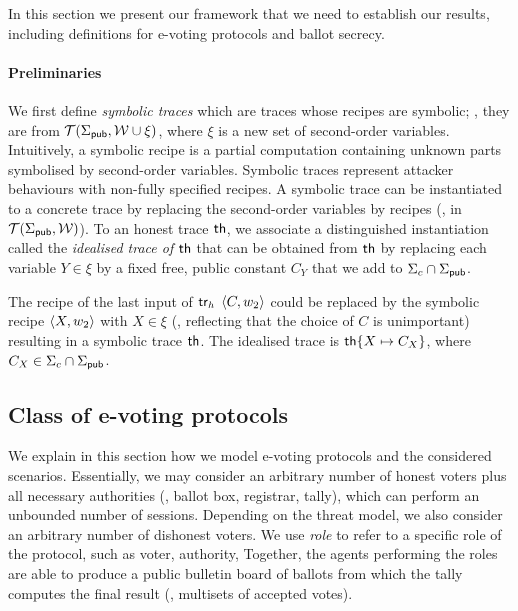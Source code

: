In this section we present our framework that we need to establish our
results, including definitions for
e-voting protocols and ballot secrecy.

\paragraph{\textbf{Preliminaries}}
We first define {\em symbolic traces} which are traces
whose recipes are symbolic; \ie, they are from $\mathcal{T}(\Sigma_{\mathsf{pub}},\mathcal{W}\cup\xi)$,
where $\xi$ is a new set of second-order variables.
Intuitively, a symbolic recipe is a partial computation
containing unknown parts symbolised by second-order variables.
Symbolic traces represent attacker behaviours with non-fully specified
recipes.
A symbolic trace can be instantiated to a concrete trace by replacing
the second-order variables by recipes (\ie, in $\mathcal{T}(\Sigma_{\mathsf{pub}},\mathcal{W})$).
To an honest trace $\mathsf{th}$, we associate a distinguished instantiation
called the {\em idealised trace of $\mathsf{th}$} 
that can be obtained from $\mathsf{th}$ by replacing each variable $Y\in\xi$ by a fixed free, public
constant $C_Y$ that we add to $\Sigma_c\cap\Sigma_{\mathsf{pub}}$.

\begin{example}
\label{ex:symbolic}
The recipe of the last input of $\mathsf{tr}_h$
$\langle C,w_2 \rangle$ %
        could be replaced
        by the symbolic recipe
$\langle X,w_2 \rangle$ with $X\in\xi$
(\ie, reflecting that the choice of $C$ is unimportant) resulting
in a symbolic trace $\mathsf{th}$.
  The idealised trace is $\mathsf{th}\{X\mapsto C_X\}$, where $C_X\in\Sigma_c\cap\Sigma_{\mathsf{pub}}$.
\end{example}



\subsection{Class of e-voting protocols}
\label{sec:class:proto}
We explain in this section how we model e-voting protocols and the
considered scenarios.  Essentially, we may consider an arbitrary
number of honest voters plus all necessary authorities (\eg, ballot box,
registrar, tally),
which can perform an unbounded number of sessions.
Depending on the threat model, we also consider an arbitrary number of dishonest voters.
We use {\em role} to refer to a specific role of the protocol, such as voter, authority, \etc
Together, the agents performing the roles are able to produce a public bulletin board of ballots from which the
tally computes the final result (\ie, multisets of accepted votes).


